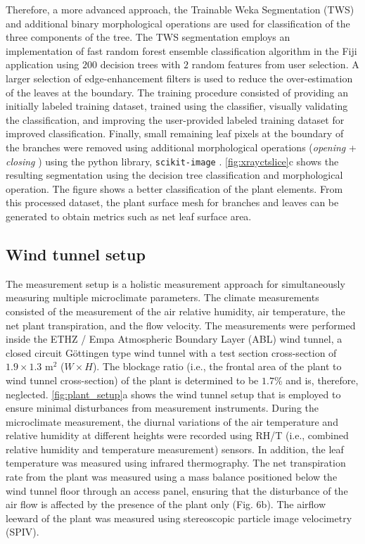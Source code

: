 Therefore, a more advanced approach, the Trainable Weka Segmentation (TWS) \citep{Arganda-Carreras2017} and additional binary morphological operations are used for classification of the three components of the tree. The TWS segmentation employs an implementation of fast random forest ensemble classification algorithm in the Fiji application \citep{Schindelin2012} using $200$ decision trees with $2$ random features from user selection. A larger selection of edge-enhancement filters is used to reduce the over-estimation of the leaves at the boundary. The training procedure consisted of providing an initially labeled training dataset, trained using the classifier, visually validating the classification, and improving the user-provided labeled training dataset for improved classification. Finally, small remaining leaf pixels at the boundary of the branches were removed using additional morphological operations (\textit{opening} + \textit{closing} \citep{Haralick1987}) using the python library, \texttt{scikit-image} \citep{VanderWalt2014a}. \cref{fig:xrayctslice}c shows the resulting segmentation using the decision tree classification and morphological operation. The figure shows a better classification of the plant elements. From this processed dataset, the plant surface mesh  for branches and leaves can be generated to obtain metrics such as net leaf surface area.


\subsection{Wind tunnel setup}
\label{subsec:windtunnelsetup}

The measurement setup is a holistic measurement approach for simultaneously measuring multiple microclimate parameters. The climate measurements consisted of the measurement of the air relative humidity, air temperature, the net plant transpiration, and the flow velocity. The measurements were performed inside the ETHZ / Empa Atmospheric Boundary Layer (ABL) wind tunnel, a closed circuit G\"ottingen type wind tunnel with a test section cross-section of $1.9\times1.3$ m$^2$ ($W\times H$). The blockage ratio (i.e., the frontal area of the plant to wind tunnel cross-section) of the plant is determined to be $1.7$\% and is, therefore, neglected. \cref{fig:plant_setup}a shows the wind tunnel setup that is employed to ensure minimal disturbances from measurement instruments. During the microclimate measurement, the diurnal variations of the air temperature and relative humidity at different heights were recorded using RH/T (i.e., combined relative humidity and temperature measurement) sensors. In addition, the leaf temperature was measured using infrared thermography. The net transpiration rate from the plant was measured using a mass balance positioned below the wind tunnel floor through an access panel, ensuring that the disturbance of the air flow is affected by the presence of the plant only (Fig. 6b). The airflow leeward of the plant was measured using stereoscopic particle image velocimetry (SPIV). 

